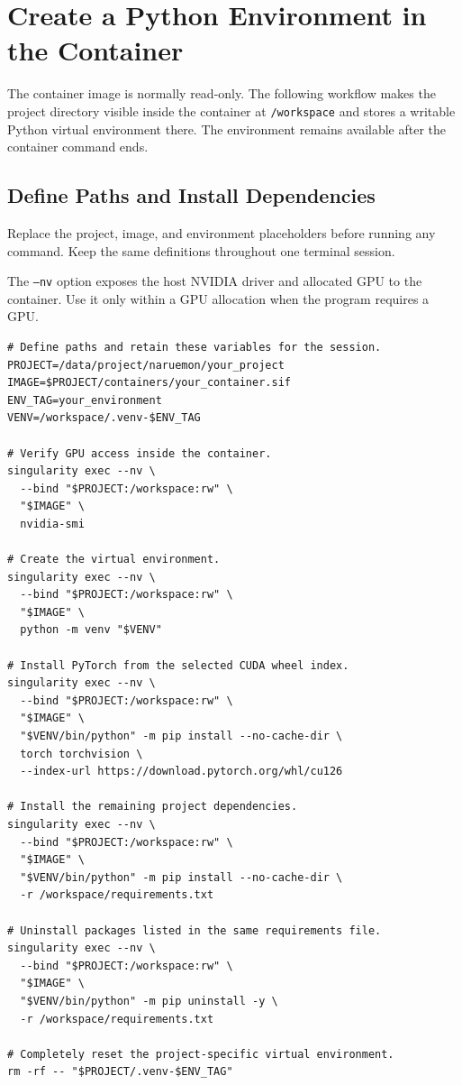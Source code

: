 \documentclass[11pt,oneside]{memoir}
\begin{document}
\section{Create a Python Environment in the Container}
\label{sec:setting-container}
The container image is normally read-only. The following workflow makes the project directory visible inside the container at \texttt{/workspace} and stores a writable Python virtual environment there. The environment remains available after the container command ends.

\subsection{Define Paths and Install Dependencies}
\label{subsec:container-environment-setup}
Replace the project, image, and environment placeholders before running any command. Keep the same definitions throughout one terminal session.

The \texttt{--nv} option exposes the host NVIDIA driver and allocated GPU to the container. Use it only within a GPU allocation when the program requires a GPU.
\begin{lstlisting}[style=terminal]
# Define paths and retain these variables for the session.
PROJECT=/data/project/naruemon/your_project
IMAGE=$PROJECT/containers/your_container.sif
ENV_TAG=your_environment
VENV=/workspace/.venv-$ENV_TAG

# Verify GPU access inside the container.
singularity exec --nv \
  --bind "$PROJECT:/workspace:rw" \
  "$IMAGE" \
  nvidia-smi

# Create the virtual environment.
singularity exec --nv \
  --bind "$PROJECT:/workspace:rw" \
  "$IMAGE" \
  python -m venv "$VENV"

# Install PyTorch from the selected CUDA wheel index.
singularity exec --nv \
  --bind "$PROJECT:/workspace:rw" \
  "$IMAGE" \
  "$VENV/bin/python" -m pip install --no-cache-dir \
  torch torchvision \
  --index-url https://download.pytorch.org/whl/cu126

# Install the remaining project dependencies.
singularity exec --nv \
  --bind "$PROJECT:/workspace:rw" \
  "$IMAGE" \
  "$VENV/bin/python" -m pip install --no-cache-dir \
  -r /workspace/requirements.txt

# Uninstall packages listed in the same requirements file.
singularity exec --nv \
  --bind "$PROJECT:/workspace:rw" \
  "$IMAGE" \
  "$VENV/bin/python" -m pip uninstall -y \
  -r /workspace/requirements.txt

# Completely reset the project-specific virtual environment.
rm -rf -- "$PROJECT/.venv-$ENV_TAG"
\end{lstlisting}
\end{document}
